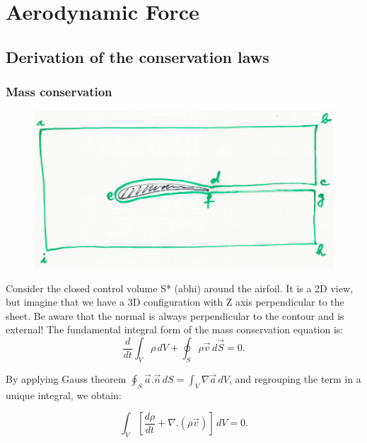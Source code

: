 
\chapter{Aerodynamic Force}
\section{Derivation of the conservation laws}
	\subsection{Mass conservation}
		
		\begin{figure}
		\vspace{-5mm}
		\includegraphics[scale=0.3]{ch1/1}
		\end{figure}
		Consider the closed control volume S* (abhi) around the airfoil. It is a 2D view, but imagine that we have a 3D configuration with Z axis perpendicular to the sheet. Be aware that the normal is always perpendicular to the contour and is external! The fundamental integral form of the mass conservation equation is:\\
		
		\begin{equation}
		\frac{d}{dt}\int _V \rho \, dV + \oint _S \rho \vec{v} \, d\vec{S} = 0.
		\end{equation}

		By applying Gauss theorem $\oint _S \vec{a}.\vec{n}\, dS = \int _V \nabla\vec{a}\, dV$, and regrouping the term in a unique integral, we obtain:
		
		\begin{equation}
		\int _V \left[\frac{d \rho}{d t} + \nabla .(\rho \vec{v})\right]\, dV = 0. 
		\end{equation}
		
